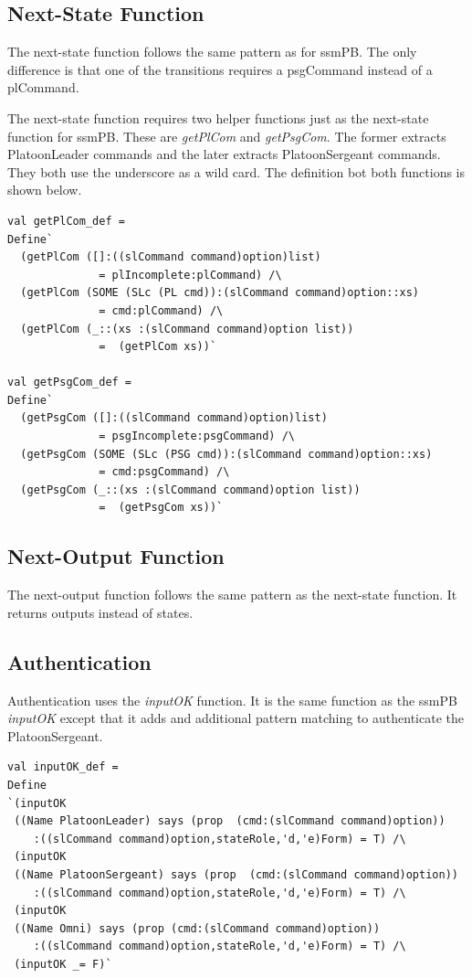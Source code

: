 \documentclass[../../main/main.tex]{subfiles}
\begin{document}
\subsection{Next-State Function}
The next-state function follows the same pattern as for ssmPB.  The only difference is that one of the transitions requires a psgCommand instead of a plCommand.

\HOLssmConductORPTheoremsconductORPNSXXdef

The next-state function requires two helper functions just as the next-state function for ssmPB.  These are \textit{getPlCom} and \textit{getPsgCom}.  The former extracts PlatoonLeader commands and the later extracts PlatoonSergeant commands.  They both use the underscore as a wild card.  The  definition bot both functions is shown below.
\begin{lstlisting}
val getPlCom_def =
Define`
  (getPlCom ([]:((slCommand command)option)list)
  		      = plIncomplete:plCommand) /\
  (getPlCom (SOME (SLc (PL cmd)):(slCommand command)option::xs)
  		      = cmd:plCommand) /\
  (getPlCom (_::(xs :(slCommand command)option list))
  		      =  (getPlCom xs))`

val getPsgCom_def =
Define`
  (getPsgCom ([]:((slCommand command)option)list)
  		      = psgIncomplete:psgCommand) /\
  (getPsgCom (SOME (SLc (PSG cmd)):(slCommand command)option::xs)
  		      = cmd:psgCommand) /\
  (getPsgCom (_::(xs :(slCommand command)option list))
  		      =  (getPsgCom xs))`
 \end{lstlisting}


\subsection{Next-Output Function}
The next-output function follows the same pattern as the next-state function.  It returns outputs instead of states.
\HOLssmConductORPTheoremsconductORPOutXXdef

\subsection{Authentication}
Authentication uses the \textit{inputOK} function.  It is the same function as the ssmPB \textit{inputOK} except that it adds and additional pattern matching to authenticate the PlatoonSergeant.

\begin{lstlisting}
val inputOK_def =
Define
`(inputOK
 ((Name PlatoonLeader) says (prop  (cmd:(slCommand command)option))
 	:((slCommand command)option,stateRole,'d,'e)Form) = T) /\
 (inputOK
 ((Name PlatoonSergeant) says (prop  (cmd:(slCommand command)option))
 	:((slCommand command)option,stateRole,'d,'e)Form) = T) /\
 (inputOK
 ((Name Omni) says (prop (cmd:(slCommand command)option))
  	:((slCommand command)option,stateRole,'d,'e)Form) = T) /\
 (inputOK _= F)`
 \end{lstlisting}
\end{document}
